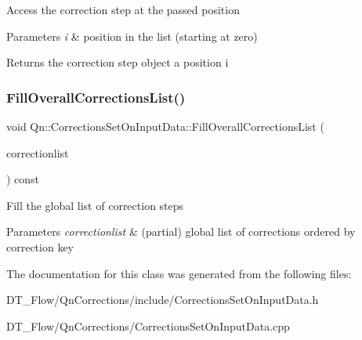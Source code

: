 Access the correction step at the passed position 
\begin{DoxyParams}{Parameters}
{\em i} & position in the list (starting at zero) \\
\hline
\end{DoxyParams}
\begin{DoxyReturn}{Returns}
the correction step object a position i 
\end{DoxyReturn}
\mbox{\label{classQn_1_1CorrectionsSetOnInputData_af1489e16bd450a64cbb33654e7559568}} 
\subsubsection{\texorpdfstring{Fill\+Overall\+Corrections\+List()}{FillOverallCorrectionsList()}}
{\footnotesize\ttfamily void Qn\+::\+Corrections\+Set\+On\+Input\+Data\+::\+Fill\+Overall\+Corrections\+List (\begin{DoxyParamCaption}\item[{T\+List $\ast$}]{correctionlist }\end{DoxyParamCaption}) const}

Fill the global list of correction steps 
\begin{DoxyParams}{Parameters}
{\em correctionlist} & (partial) global list of corrections ordered by correction key \\
\hline
\end{DoxyParams}


The documentation for this class was generated from the following files\+:\begin{DoxyCompactItemize}
\item 
D\+T\+\_\+\+Flow/\+Qn\+Corrections/include/Corrections\+Set\+On\+Input\+Data.\+h\item 
D\+T\+\_\+\+Flow/\+Qn\+Corrections/Corrections\+Set\+On\+Input\+Data.\+cpp\end{DoxyCompactItemize}
